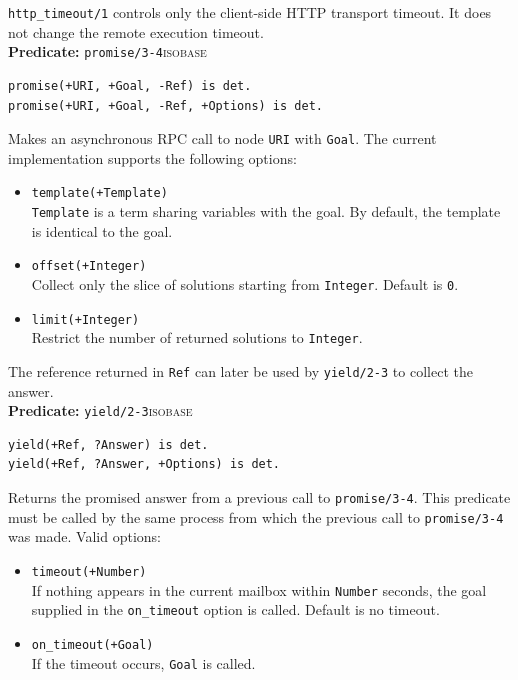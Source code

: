 \noindent \texttt{http\_timeout/1} controls only the client-side HTTP transport
timeout. It does not change the remote execution timeout.\\

\noindent \textbf{Predicate:} \texttt{promise/3-4}\hfill\textsc{isobase}

\begin{verbatim}
promise(+URI, +Goal, -Ref) is det.
promise(+URI, +Goal, -Ref, +Options) is det.
\end{verbatim}

\noindent Makes an asynchronous RPC call to node \texttt{URI} with
\texttt{Goal}. The current implementation supports the following options:

\begin{itemize}
\item
  \texttt{template(+Template)}\\
  \texttt{Template} is a term sharing variables with the goal. By default, the
  template is identical to the goal.
\item
  \texttt{offset(+Integer)}\\
  Collect only the slice of solutions starting from \texttt{Integer}. Default
  is \texttt{0}.
\item
  \texttt{limit(+Integer)}\\
  Restrict the number of returned solutions to \texttt{Integer}.
\end{itemize}

\noindent The reference returned in \texttt{Ref} can later be used by
\texttt{yield/2-3} to collect the answer.\\

\noindent \textbf{Predicate:} \texttt{yield/2-3}\hfill\textsc{isobase}

\begin{verbatim}
yield(+Ref, ?Answer) is det.
yield(+Ref, ?Answer, +Options) is det.
\end{verbatim}

\noindent Returns the promised answer from a previous call to
\texttt{promise/3-4}. This predicate must be called by the same process from
which the previous call to \texttt{promise/3-4} was made. Valid options:

\begin{itemize}
\item
  \texttt{timeout(+Number)}\\
  If nothing appears in the current mailbox within \texttt{Number} seconds,
  the goal supplied in the \texttt{on\_timeout} option is called. Default is no
  timeout.
\item
  \texttt{on\_timeout(+Goal)}\\
  If the timeout occurs, \texttt{Goal} is called.
\end{itemize}

